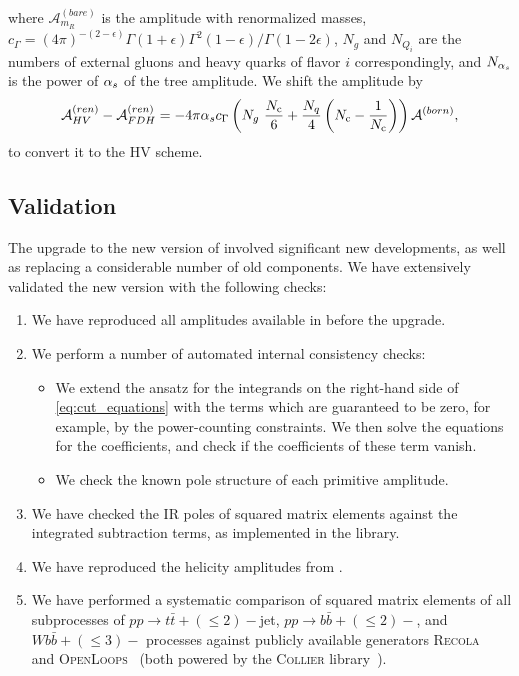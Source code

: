 where $\mathcal{A}^{(bare)}_{m_R}$ is the amplitude with renormalized masses,
$\displaystyle c_\Gamma={(4\pi)^{-(2-\epsilon)}{\Gamma(1+\epsilon)\Gamma^2(1-\epsilon)}/\Gamma(1-2\epsilon)}$,
$N_g$ and $N_{Q_i}$ are the numbers of external gluons and heavy quarks of flavor $i$ correspondingly,
and $N_{\alpha_s}$ is the power of $\alpha_s$ of the tree amplitude.
We shift \cite{Signer:2008va} the amplitude by
\begin{equation}
  \mathcal{A}^{(ren)}_{HV} - \mathcal{A}^{(ren)}_{FDH} = -4\pi \alpha_s c_\Gamma\left(N_{g}~\frac{N_\mathrm{c}}{6} + \frac{N_q}{4}\left(N_\mathrm{c} -\frac{1}{N_\mathrm{c}}\right)\right)\mathcal{A}^{(born)},
  \label{schemeshift}
\end{equation}
to convert it to the HV scheme.



\subsection{Validation}

The upgrade to the new version of \BlackHat{} involved significant new developments,
as well as replacing a considerable number of old components.
We have extensively validated the new version with the following checks:
\begin{enumerate}
  \item We have reproduced all amplitudes available in \BlackHat{} before the upgrade.
  \item We perform a number of automated internal consistency checks:
    \begin{itemize}
      \item We extend the ansatz for the integrands on the right-hand side of \cref{eq:cut_equations} with the terms which are guaranteed to be zero, for example, by the power-counting constraints.
        We then solve the equations for the coefficients, and check if the coefficients of these term vanish.
      \item We check the known pole structure \cite{Catani:2000ef} of each primitive amplitude.
    \end{itemize}
  \item We have checked the IR poles of squared matrix elements against the integrated subtraction terms,
    as implemented in the \SHERPA{} library.
  \item We have reproduced the helicity amplitudes from \cite{Ellis:2008ir}.
  \item We have performed a systematic comparison of squared matrix elements 
    of all subprocesses of $pp\rightarrow t\bar t+(\leq 2)-$jet, $pp\rightarrow b\bar b+(\leq 2)-$, and
$Wb\bar b+(\leq3)-$ processes against publicly available generators 
\textsc{Recola}~\cite{Actis:2016mpe} and \textsc{OpenLoops}~\cite{Cascioli:2011va} 
(both powered by the \textsc{Collier} library~\cite{Denner:2016kdg}).
\end{enumerate}

